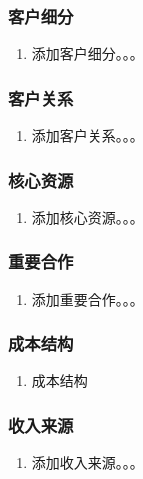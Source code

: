 \documentclass[a4paper]{ctexart}
\begin{document}
\subsubsection{客户细分}

\begin{enumerate}[label=\alph*.]
  \item 添加客户细分。。。
\end{enumerate}

\subsubsection{客户关系}

\begin{enumerate}[label=\alph*.]
  \item 添加客户关系。。。
\end{enumerate}

\subsubsection{核心资源}

\begin{enumerate}[label=\alph*.]
  \item 添加核心资源。。。
\end{enumerate}

\subsubsection{重要合作}

\begin{enumerate}[label=\alph*.]
  \item 添加重要合作。。。
\end{enumerate}

\subsubsection{成本结构}

\begin{enumerate}[label=\alph*.]
  \item 成本结构
\end{enumerate}

\subsubsection{收入来源}

\begin{enumerate}[label=\alph*.]
  \item 添加收入来源。。。
\end{enumerate}
\end{document}
